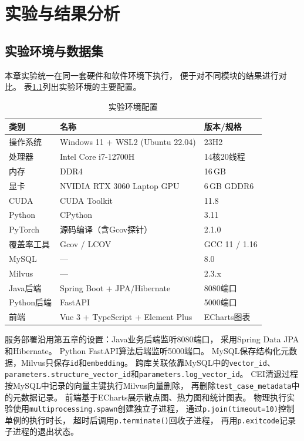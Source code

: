 \chapter{实验与结果分析}

\section{实验环境与数据集}

本章实验统一在同一套硬件和软件环境下执行，
便于对不同模块的结果进行对比。
表\ref{tab:exp_env}列出实验环境的主要配置。

\begin{table}[htbp]
\centering
\caption{实验环境配置}
\label{tab:exp_env}
\begin{tabular}{lll}
\toprule
类别 & 名称 & 版本/规格 \\
\midrule
操作系统 & Windows 11 + WSL2 (Ubuntu 22.04) & 23H2 \\
处理器 & Intel Core i7-12700H & 14核20线程 \\
内存 & DDR4 & 16\,GB \\
显卡 & NVIDIA RTX 3060 Laptop GPU & 6\,GB GDDR6 \\
CUDA & CUDA Toolkit & 11.8 \\
Python & CPython & 3.11 \\
PyTorch & 源码编译（含Gcov探针） & 2.1.0 \\
覆盖率工具 & Gcov / LCOV & GCC 11 / 1.16 \\
MySQL & --- & 8.0 \\
Milvus & --- & 2.3.x \\
Java后端 & Spring Boot + JPA/Hibernate & 8080端口 \\
Python后端 & FastAPI & 5000端口 \\
前端 & Vue 3 + TypeScript + Element Plus & ECharts图表 \\
\bottomrule
\end{tabular}
\end{table}

服务部署沿用第五章的设置：Java业务后端监听8080端口，
采用Spring Data JPA和Hibernate。
Python FastAPI算法后端监听5000端口。
MySQL保存结构化元数据，Milvus只保存\texttt{id}和\texttt{embedding}。
跨库关联依靠MySQL中的\texttt{vector\_id}、
\texttt{parameters.structure\_vector\_id}和\texttt{parameters.log\_vector\_id}。
CEI清退过程按MySQL中记录的向量主键执行Milvus向量删除，
再删除\texttt{test\_case\_metadata}中的元数据记录。
前端基于ECharts展示散点图、热力图和统计图表。
物理执行实验使用\texttt{multiprocessing.spawn}创建独立子进程，
通过\texttt{p.join(timeout=10)}控制单例的执行时长，
超时后调用\texttt{p.terminate()}回收子进程，
再用\texttt{p.exitcode}记录子进程的退出状态。


